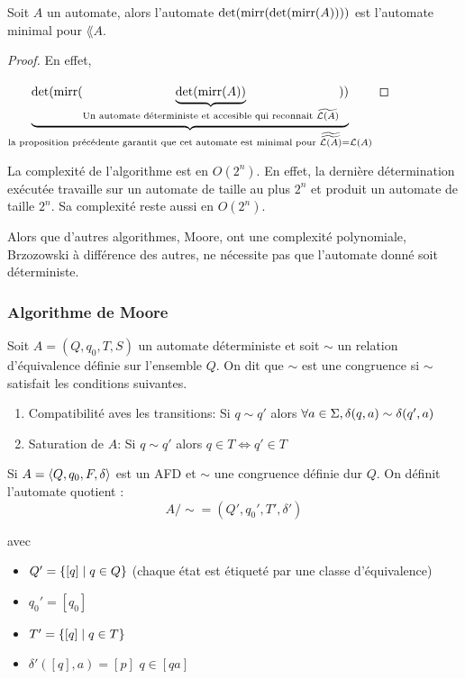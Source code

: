\begin{coro}
	Soit $A$ un automate, alors l'automate $\text{det} (\text{mirr} (\text{det}(\text{mirr} (A))))$ est l'automate minimal pour $\lang A$.
\end{coro}

\begin{proof}
	En effet,

	$\underbrace{\text{det} (\text{mirr} (
			\underbrace{\text{det}(\text{mirr} (A))}_{\text{Un automate déterministe et accesible qui reconnait }\widetilde{\mathcal{L}\left(A\right)}}
			))}_{\text{la proposition précédente garantit que cet automate est minimal pour }  \widetilde{\widetilde{\mathcal{L}\left(A\right)} } = \mathcal{L}\left(A\right)}
	$
\end{proof}

\begin{complexite}
	La complexité de l'algorithme est en $O(2^n)$. En effet, la dernière détermination exécutée travaille sur un automate de taille au plus $2^n$
	et produit un automate de taille $2^n$. Sa complexité reste aussi en $O(2^n)$.
\end{complexite}


\begin{remarque}
	Alors que d'autres algorithmes, \tq Moore, ont une complexité polynomiale, Brzozowski à différence des autres, ne nécessite pas
	que l'automate donné soit déterministe.
\end{remarque}

\subsubsection{Algorithme de Moore}


\begin{definition}
	Soit $A = (Q,q_0,T,S)$ un automate déterministe et soit $\sim$ un relation d'équivalence définie sur l'ensemble $Q$. On dit que
	$\sim$ est une congruence si $\sim$ satisfait les conditions suivantes.
	\begin{enumerate}
		\item Compatibilité aves les transitions: Si $q \sim q'$ alors $\forall a \in \Sigma, \delta (q,a) \sim \delta (q',a)$
		\item Saturation de $A$: Si $q \sim q'$ alors $q \in T \iff q' \in T$
	\end{enumerate}
\end{definition}


\begin{definition}
	Si $A = \langle Q, q_0, F, \delta \rangle$ est un AFD et $\sim$ une congruence définie dur $Q$. On définit l'automate quotient :
	$$ A/\sim = (Q',q_0',T',\delta') $$

	avec \begin{itemize}
		\item $Q' = \left\{[q] \mid q\in Q\right\}$ (chaque état est étiqueté par une classe d'équivalence)
		\item $q_0' = [q_0]$
		\item $T' =\left\{[q] \mid q \in T\right\}$
		\item $\delta'([q], a) = [p]$ \ssi $q \in [qa]$
	\end{itemize}

\end{definition}


